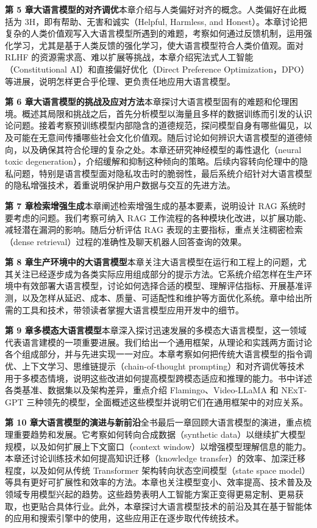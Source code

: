 \noindent\textbf{第 5 章\quad 大语言模型的对齐调优}\enspace 本章介绍与人类偏好对齐的概念。人类偏好在此概括为 3H，即有帮助、无害和诚实（Helpful, Harmless, and Honest）。本章讨论把复杂的人类价值观写入大语言模型所遇到的难题，考察如何通过反馈机制，运用强化学习，尤其是基于人类反馈的强化学习，使大语言模型符合人类价值观。面对 RLHF 的资源需求高、难以扩展等挑战，本章介绍宪法式人工智能（Constitutional AI）和直接偏好优化（Direct Preference Optimization，DPO）等进展，说明怎样更合乎伦理、更负责任地应用大语言模型。

\noindent\textbf{第 6 章\quad 大语言模型的挑战及应对方法}\enspace 本章探讨大语言模型固有的难题和伦理困境。概述其局限和挑战之后，首先分析模型以海量且多样的数据训练而引发的认识论问题。接着考察预训练模型内部隐含的道德规范，探问模型自身有哪些偏见，以及可能在无意间传播哪些社会文化价值观。随后讨论如何辨识大语言模型的道德倾向，以及确保其符合伦理的复杂之处。本章还研究神经模型的毒性退化（neural toxic degeneration），介绍缓解和抑制这种倾向的策略。后续内容转向伦理中的隐私问题，特别是语言模型面对隐私攻击时的脆弱性，最后系统介绍针对大语言模型的隐私增强技术，着重说明保护用户数据与交互的先进方法。

\noindent\textbf{第 7 章\quad 检索增强生成}\enspace 本章阐述检索增强生成的基本要素，说明设计 RAG 系统时要考虑的问题。我们考察可纳入 RAG 工作流程的各种模块化改进，以扩展功能、减轻潜在漏洞的影响。随后分析评估 RAG 表现的主要指标，重点关注稠密检索（dense retrieval）过程的准确性及聊天机器人回答查询的效果。

\noindent\textbf{第 8 章\quad 生产环境中的大语言模型}\enspace 本章关注大语言模型在运行和工程上的问题，尤其关注已经逐步成为各类实际应用组成部分的提示方法。它系统介绍怎样在生产环境中有效部署大语言模型，讨论如何选择合适的模型、理解评估指标、开展基准评测，以及怎样从延迟、成本、质量、可适配性和维护等方面优化系统。章中给出所需的工具和技术，带领读者掌握大语言模型应用开发中的细节。

\noindent\textbf{第 9 章\quad 多模态大语言模型}\enspace 本章深入探讨迅速发展的多模态大语言模型，这一领域代表语言建模的一项重要进展。我们给出一个通用框架，从理论和实践两方面讨论各个组成部分，并与先进实现一一对应。本章考察如何把传统大语言模型的指令调优、上下文学习、思维链提示（chain-of-thought prompting）和对齐调优等技术用于多模态情境，说明这些改进如何提高模型跨模态适应和推理的能力。书中详述各类基准、数据集以及架构差异，重点介绍 Flamingo、Video-LLaMA 和 NExT-GPT 三种领先的模型，全面概述这些模型并说明它们在通用框架中的对应关系。

\noindent\textbf{第 10 章\quad 大语言模型的演进与新前沿}\enspace 全书最后一章回顾大语言模型的演进，重点梳理重要趋势和发展。它考察如何转向合成数据（synthetic data）以继续扩大模型规模，以及如何扩展上下文窗口（context window）以增强模型理解信息的能力。本章还讨论训练技术如何提高知识迁移（knowledge transfer）的效率、加深迁移程度，以及如何从传统 Transformer 架构转向状态空间模型（state space model）等具有更好可扩展性和效率的方法。本章也关注模型变小、效率提高、技术普及及领域专用模型兴起的趋势。这些趋势表明人工智能方案正变得更易定制、更易获取，也更贴合具体行业。此外，本章探讨大语言模型技术的前沿及其在基于智能体的应用和搜索引擎中的使用，这些应用正在逐步取代传统技术。

